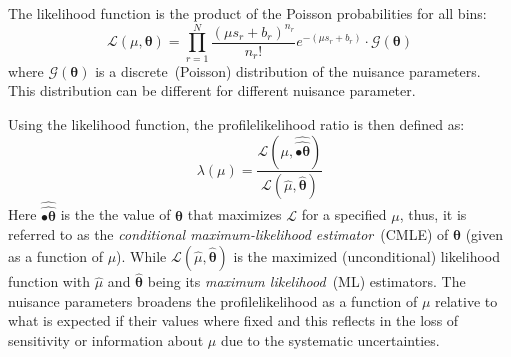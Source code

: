 The likelihood function is the product of the Poisson probabilities for all bins:
\begin{equation}\label{eq:LL}
\mathcal{L}\left( \mu, \mathbf{\theta} \right) = \prod^{N}_{r=1} \frac{{\left( \mu s_{r} + b_{r} \right)}^{n_{r}}}{n_{r}!} e^{-(\mu s_{r} + b_{r})} \cdot \mathcal{G}(\mathbf{\theta} )
\end{equation}
where $\mathcal{G}(\mathbf{\theta} )$ is a discrete~(Poisson) distribution of the nuisance parameters. This distribution can be different for different nuisance parameter.

Using the likelihood function, the profilelikelihood ratio is then defined as:
\begin{equation}\label{eq:PLL}
\lambda(\mu) =  \frac{\mathcal{L}(\mu, \hat{\hat{\mathbf{•\theta}}})}{\mathcal{L}(\hat{\mu}, \hat{\mathbf{\theta}} )}
\end{equation}
Here $\hat{\hat{\mathbf{•\theta}}} $ is the the value of $\mathbf{\theta}$ that maximizes $\mathcal{L}$ for a specified $\mu$, thus, it is referred to as the \textit{conditional maximum-likelihood estimator}~(CMLE) of $\mathbf{\theta}$ (given as a function of $\mu$). While $\mathcal{L}(\hat{\mu}, \hat{\mathbf{\theta}} )$ is the maximized (unconditional) likelihood function with $\hat{\mu}$ and $\hat{\mathbf{\theta}}$ being its \textit{maximum likelihood}~(ML) estimators.
The nuisance parameters broadens the profilelikelihood as a function of $\mu$ relative to what is expected if their values where fixed and this reflects in the loss of sensitivity or information about $\mu$ due to the systematic uncertainties.
